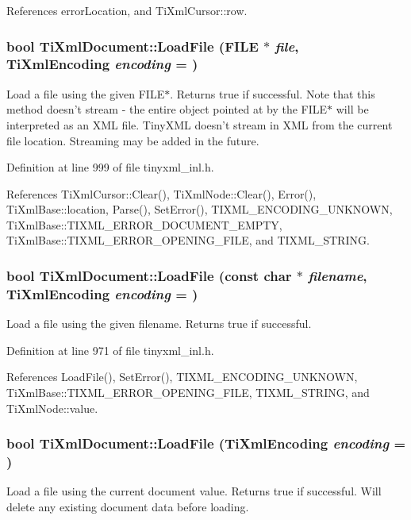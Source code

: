 References errorLocation, and TiXmlCursor::row.\hypertarget{class_ti_xml_document_a41f6fe7200864d1dca663d230caf8db6}{
\subsubsection[{LoadFile}]{\setlength{\rightskip}{0pt plus 5cm}bool TiXmlDocument::LoadFile (FILE $\ast$ {\em file}, \/  {\bf TiXmlEncoding} {\em encoding} = {})}}
\label{class_ti_xml_document_a41f6fe7200864d1dca663d230caf8db6}
Load a file using the given FILE$\ast$. Returns true if successful. Note that this method doesn't stream -\/ the entire object pointed at by the FILE$\ast$ will be interpreted as an XML file. TinyXML doesn't stream in XML from the current file location. Streaming may be added in the future. 

Definition at line 999 of file tinyxml\_\-inl.h.

References TiXmlCursor::Clear(), TiXmlNode::Clear(), Error(), TiXmlBase::location, Parse(), SetError(), TIXML\_\-ENCODING\_\-UNKNOWN, TiXmlBase::TIXML\_\-ERROR\_\-DOCUMENT\_\-EMPTY, TiXmlBase::TIXML\_\-ERROR\_\-OPENING\_\-FILE, and TIXML\_\-STRING.\hypertarget{class_ti_xml_document_a879cdf5e981b8b2d2ef82f2546dd28fb}{
\subsubsection[{LoadFile}]{\setlength{\rightskip}{0pt plus 5cm}bool TiXmlDocument::LoadFile (const char $\ast$ {\em filename}, \/  {\bf TiXmlEncoding} {\em encoding} = {})}}
\label{class_ti_xml_document_a879cdf5e981b8b2d2ef82f2546dd28fb}


Load a file using the given filename. Returns true if successful. 

Definition at line 971 of file tinyxml\_\-inl.h.

References LoadFile(), SetError(), TIXML\_\-ENCODING\_\-UNKNOWN, TiXmlBase::TIXML\_\-ERROR\_\-OPENING\_\-FILE, TIXML\_\-STRING, and TiXmlNode::value.\hypertarget{class_ti_xml_document_a4c852a889c02cf251117fd1d9fe1845f}{
\subsubsection[{LoadFile}]{\setlength{\rightskip}{0pt plus 5cm}bool TiXmlDocument::LoadFile ({\bf TiXmlEncoding} {\em encoding} = {})}}
\label{class_ti_xml_document_a4c852a889c02cf251117fd1d9fe1845f}
Load a file using the current document value. Returns true if successful. Will delete any existing document data before loading. 

